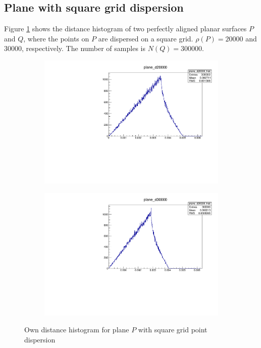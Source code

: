 \subsection{Plane with square grid dispersion}
Figure \ref{fig:plane_cphist} shows the distance histogram of two perfectly aligned planar surfaces $P$ and $Q$, where the points on $P$ are dispersed on a square grid. $\rho(P) = 20000$ and $30000$, respectively. The number of samples is $N(Q) = 300000$.

\begin{figure}[H]
\centering
\begin{subfigure}{.5\textwidth}
\includegraphics[width=\linewidth]{fig/plane_d20000.pdf}
\end{subfigure}%
\begin{subfigure}{.5\textwidth}
\includegraphics[width=\linewidth]{fig/plane_d30000.pdf}
\end{subfigure}
\caption{Own distance histogram for plane $P$ with square grid point dispersion}
\label{fig:plane_cphist}
\end{figure}

